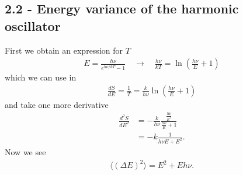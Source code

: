 \documentclass[10pt,a4paper]{book}
\theoremstyle{definition}
\begin{document}
\subsection{2.2 - Energy variance of the harmonic oscillator}
First we obtain an expression for $T$
\begin{align}
    E=\frac{h\nu}{e^{h\nu/kT}-1}\quad\rightarrow\quad\frac{h\nu}{kT}=\ln\left(\frac{h\nu}{E}+1\right)
\end{align}
which we can use in
\begin{align}
    \frac{dS}{dE}=\frac{1}{T}=\frac{k}{h\nu}\ln\left(\frac{h\nu}{E}+1\right)
\end{align}
and take one more derivative
\begin{align}
    \frac{d^2S}{dE^2}&=-\frac{k}{h\nu}\frac{\frac{h\nu}{E^2}}{\frac{h\nu}{E}+1}\\
    &=-k\frac{1}{ h\nu E+E^2}.
\end{align}
Now we see
\begin{align}
    \langle(\Delta E)^2\rangle=E^2+E h \nu.
\end{align}
\end{document}
